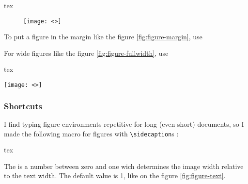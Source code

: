 \documentclass[
	raggedright,
	12pt,
	colorful,
]{tufte-style-article}
\begin{document}
\begin{codebox}{tex}
\begin{figure}
	\texttt{[image: <>]} %
\end{figure}
\end{codebox}


To put a figure in the margin like the figure \ref{fig:figure-margin}, use


For wide figures like the figure \ref{fig:figure-fullwidth}, use

\begin{codebox}{tex}
\begin{figure*}
	\texttt{[image: <>]} %
\end{figure*}
\end{codebox}




\subsubsection{Shortcuts}

I find typing figure environments repetitive for long (even short) documents, so I made the following macro for figures with \texttt{\textbackslash sidecaption}s :

\begin{codebox}{tex}
\end{codebox}

The  is a number between zero and one wich determines the image width relative to the text width. The default value is 1, like on the figure \ref{fig:figure-text}.
\end{document}
